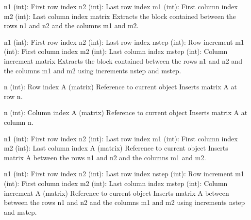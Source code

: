 {n1 (int): First row index\newline
n2 (int): Last row index\newline
m1 (int): First column index\newline
m2 (int): Last column index}
{matrix}
{Extracts the block contained between the rows n1 and n2 and the columns m1 and m2.}

{n1 (int): First row index\newline
n2 (int): Last row index\newline
nstep (int): Row increment\newline
m1 (int): First column index\newline
m2 (int): Last column index\newline
mstep (int): Column increment}
{matrix}
{Extracts the block contained between the rows n1 and n2 and the columns m1 and m2 using increments nstep and mstep.}

{n (int): Row index\newline
A (matrix)}
{Reference to current object}
{Inserts matrix A at row n.}

{n (int): Column index\newline
A (matrix)}
{Reference to current object}
{Inserts matrix A at column n.}

{n1 (int): First row index\newline
n2 (int): Last row index\newline
m1 (int): First column index\newline
m2 (int): Last column index\newline
A (matrix)}
{Reference to current object}
{Inserts matrix A between the rows n1 and n2 and the columns m1 and m2.}

{n1 (int): First row index\newline
n2 (int): Last row index\newline
nstep (int): Row increment\newline
m1 (int): First column index\newline
m2 (int): Last column index\newline
mstep (int): Column increment\newline
A (matrix)}
{Reference to current object}
{Inserts matrix A between between the rows n1 and n2 and the columns m1 and m2 
using increments nstep and mstep.}

